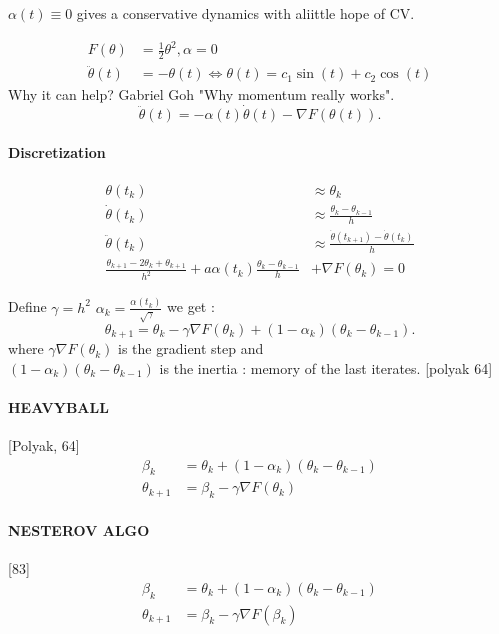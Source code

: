 \begin{note}
    $ \alpha (t) \equiv 0 $  gives a conservative dynamics with aliittle hope of CV.

    \begin{align*}
        F(\theta ) &= \frac{1}{2}\theta ^2, \alpha = 0 \\
        \ddot{\theta }(t) &= - \theta (t) \Leftrightarrow \theta (t) = c_1 \sin (t) + c_2 \cos (t)
    \end{align*}
    Why it can help? Gabriel Goh "Why momentum really works".
    \[
        \ddot{\theta }(t) = - \alpha (t) \dot{\theta }(t) - \nabla F(\theta (t))
    .\]
    
    \paragraph*{Discretization }
    \begin{align*}
        \theta (t_k) & \approx \theta _k \\
        \dot{\theta } (t_k) & \approx \frac{\theta _k - \theta _{k-1}}{h} \\
        \ddot{\theta } (t_k) & \approx \frac{\dot{\theta }(t_{k+1}) - \dot{\theta }(t_k)}{h} \\
        \frac{\theta _{k+1} - 2 \theta _{k} + \theta _{k+1}}{h^2} + a \alpha (t_k) \frac{\theta _{k}- \theta _{k-1} }{h} &+ \nabla F(\theta _{k}) = 0
    \end{align*}
    
    Define $\gamma = h^2$  $\alpha_k = \frac{\alpha (t_k)}{\sqrt[]{\gamma }}$ we get :
    \[
        \theta _{k+1} = \theta _{k} - \gamma \nabla F(\theta _{k}) + (1 - \alpha_k )(\theta _{k} - \theta _{k-1})
    .\]
    where $\gamma \nabla F(\theta _{k})$ is the gradient step and \\
    $ (1 - \alpha_k )(\theta _{k} - \theta _{k-1})$ is the inertia : memory of the last iterates. [polyak 64]


    \paragraph*{HEAVYBALL}[Polyak, 64]
    \begin{align*}
        \beta _k &= \theta _k + (1 - \alpha _k) (\theta _k - \theta _{k-1}) \\
        \theta _{k+1} &= \beta _k - \gamma \nabla F(\theta _k)
    \end{align*}

    \paragraph*{NESTEROV ALGO}[83]
    \begin{align*}
        \beta _k &= \theta _k + (1 - \alpha _k) (\theta _k - \theta _{k-1}) \\
        \theta _{k+1} &= \beta _k - \gamma \nabla F(\beta _k)
    \end{align*}


\end{note}
